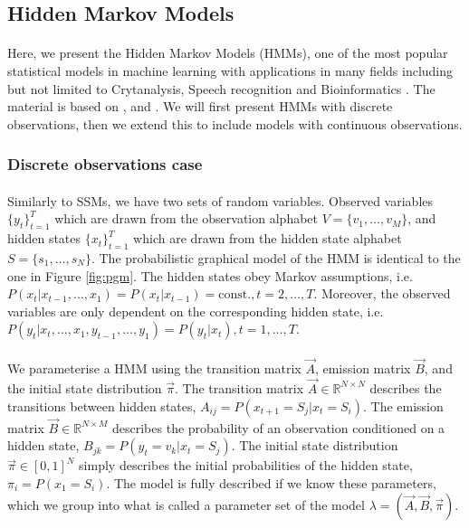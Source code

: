 \subsection{Hidden Markov Models}

\paragraph{}
	Here, we present the Hidden Markov Models (HMMs), one of the most popular statistical models in machine learning with applications in many fields including but not limited to Crytanalysis, Speech recognition and Bioinformatics \cite{wiki:HMM}. The material is based on \cite{rabiner1989tutorial}, \cite{ramage07} and \cite{mlBook}. We will first present HMMs with discrete observations, then we extend this to include models with continuous observations.
	
\subsubsection{Discrete observations case}
\paragraph{}
	Similarly to SSMs, we have two sets of random variables. Observed variables $\{ y_t \}_{t = 1}^T$ which are drawn from the observation alphabet $V = \{v_1, \dotsc, v_M\}$, and hidden states $\{ x_t \}_{t = 1}^T$ which are drawn from the hidden state alphabet $S = \{ s_1, \dotsc, s_N \}$. The probabilistic graphical model of the HMM is identical to the one in Figure \ref{fig:pgm}. The hidden states obey Markov assumptions, i.e. $P( x_t | x_{t - 1}, \dotsc, x_1) = P(x_t | x_{t - 1}) = \text{const.}, t = 2, \dotsc, T$. Moreover, the observed variables are only dependent on the corresponding hidden state, i.e. $P( y_t | x_t, \dotsc, x_1, y_{t - 1}, \dotsc, y_1) = P(y_t | x_t), t = 1, \dotsc, T$.
	
\paragraph{}
	We parameterise a HMM using the transition matrix $\vec A$, emission matrix $\vec B$, and the initial state distribution $\vec \pi$. The transition matrix $\vec A \in \mathbb{R}^{N \times N}$ describes the transitions between hidden states, $A_{ij} = P(x_{t + 1} = S_j | x_t = S_i)$. The emission matrix $\vec B \in \mathbb{R}^{N \times M}$ describes the probability of an observation conditioned on a hidden state, $B_{jk} = P(y_t = v_k | x_t = S_j)$. The initial state distribution $\vec \pi \in [0, 1]^N$ simply describes the initial probabilities of the hidden state, $\pi_i = P(x_1 = S_i)$. The model is fully described if we know these parameters, which we group into what is called a parameter set of the model $\lambda = (\vec A, \vec B, \vec \pi)$.
	
